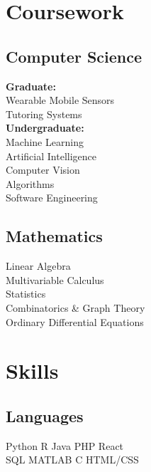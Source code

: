 \documentclass[letterpaper]{deedy-resume} %
\begin{document}
\begin{minipage}[t]{0.33\textwidth}
\section{\faBook \hspace{1mm} Coursework}
\subsection{Computer Science}
\textbf{Graduate:} \\
Wearable Mobile Sensors \\
Tutoring Systems \\ 
\vspace{\topsep}
\textbf{Undergraduate:} \\
Machine Learning \\
Artificial Intelligence \\
Computer Vision \\
Algorithms \\
Software Engineering \\


\sectionspace %

\subsection{Mathematics}
Linear Algebra \\
Multivariable Calculus \\
Statistics \\
Combinatorics \& Graph Theory \\
Ordinary Differential Equations \\


\sectionspace %


\section{\faListUl\hspace{1mm} Skills}

\subsection{Languages}

Python \textbullet{} R \textbullet{} Java \textbullet{} PHP \textbullet{} React \\
SQL \textbullet{}MATLAB \textbullet{} C \textbullet{} HTML/CSS \\ 


\end{minipage}
\end{document}
